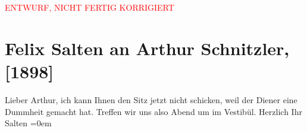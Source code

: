 
\begin{center}
            \textcolor{red}{ENTWURF, NICHT FERTIG KORRIGIERT}
                      \end{center}
            
         \renewcommand{\erwaehnteOrte}{Orte: Wien}
         \renewcommand{\erwaehnteWerke}{}
               \section[Felix Salten an Arthur Schnitzler, {[}1898{]}]{ Felix Salten an Arthur Schnitzler, {[}1898{]}}\nopagebreak{}\rehead{ }\begin{ledgroupsized}[t]{13cm}\normalsize\beginnumbering \toendnotes[C]{\smallbreak\pagebreak[2]} 
\toendnotes[C]{\smallbreak}\pstart
           \noindent{}{\pb}Lieber Arthur, ich kann Ihnen den Sitz jetzt nicht schicken, weil
               der Diener eine Dummheit gemacht hat. Treffen wir uns also Abend um \label{K_L03278-1v}\label{K_L03278-1h} im Vestibül.\pend
           \pstart
           Herzlich Ihr {\\[\baselineskip]}\spacefill\mbox{Salten}\pend
           \leftskip=0em{}
         
         \endnumbering{}\end{ledgroupsized}\begin{anhang}\end{anhang}\newcommand{\dateiname}{L03278}\newcommand{\titel}{Felix Salten an Arthur Schnitzler, [1898]}\newcommand{\editorInnen}{Martin Anton Müller und Laura Untner}
      